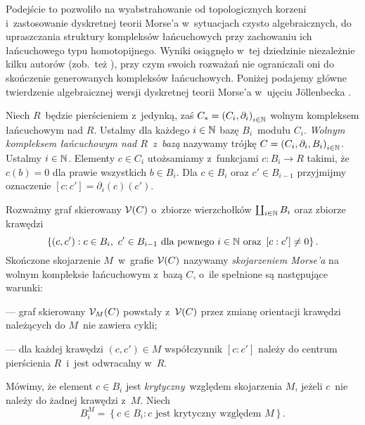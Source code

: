 Podejście to pozwoliło na wyabstrahowanie od topologicznych korzeni i~zastosowanie dyskretnej teorii Morse'a w~sytuacjach czysto algebraicznych, do upraszczania struktury kompleksów łańcuchowych przy zachowaniu ich łańcuchowego typu homotopijnego. Wyniki osiągnęło w~tej dziedzinie niezależnie kilku autorów \cite{Jollenbeck05,Kozlov05,Skoldberg06} (zob.~też \cite{Mrozek09,Freij07,Skoldberg13}), przy czym swoich rozważań nie ograniczali oni do skończenie generowanych kompleksów łańcuchowych.
Poniżej podajemy główne twierdzenie algebraicznej wersji dyskretnej teorii Morse'a w~ujęciu J\"ollenbecka \cite{Jollenbeck05}.

Niech $R$~będzie pierścieniem z~jedynką, zaś $C_*=\left(C_i,\partial_i\right)_{i\in\mathbb{N}}$ wolnym kompleksem łańcuchowym nad $R$. Ustalmy dla każdego $i\in \mathbb{N}$ bazę $B_i$~modułu $C_i$. \textit{Wolnym kompleksem łańcuchowym nad $R$~z~bazą} nazywamy trójkę $C=\left(C_i,\partial_i,B_i\right)_{i\in\mathbb{N}}$. Ustalmy $i\in \mathbb{N}$. Elementy $c\in C_i$ utożsamiamy z~funkcjami $c\colon B_i\to R$ takimi, że $c(b)=0$ dla prawie wszystkich $b\in B_i$. Dla $c\in B_i$ oraz $c'\in B_{i-1}$ przyjmijmy oznaczenie $\left[c:c'\right]=\partial_i(c)(c')$.

Rozważmy graf skierowany $\mathcal{V}(C)$ o~zbiorze wierzchołków $\coprod_{i\in\mathbb{N}} B_i$ oraz zbiorze krawędzi \[\left\{\left(c,c'\right):c\in B_i,\ c'\in B_{i-1} \text{ dla pewnego } i\in\mathbb{N} \text{ oraz } \left[c:c'\right]\not=0\right\}.\] Skończone skojarzenie $M$~w~grafie $\mathcal{V}(C)$ nazywamy \textit{skojarzeniem Morse'a} na wolnym kompleksie łańcuchowym z~bazą $C$, o~ile spełnione są następujące warunki:
\begin{compactitem}
\item[---]graf skierowany $\mathcal{V}_M(C)$ powstały z~$\mathcal{V}(C)$ przez zmianę orientacji krawędzi należących do $M$~nie zawiera cykli;
\item[---]dla każdej krawędzi $\left(c,c'\right)\in M$ współczynnik $\left[c:c'\right]$ należy do centrum pierścienia $R$~i~jest odwracalny w~$R$.
\end{compactitem}

Mówimy, że element $c\in B_i$ jest \textit{krytyczny}~względem skojarzenia $M$, jeżeli $c$~nie należy do żadnej krawędzi z~$M$. Niech \[B_i^M=\left\{c\in B_i:c\text{ jest krytyczny względem } M\right\}.\] 

